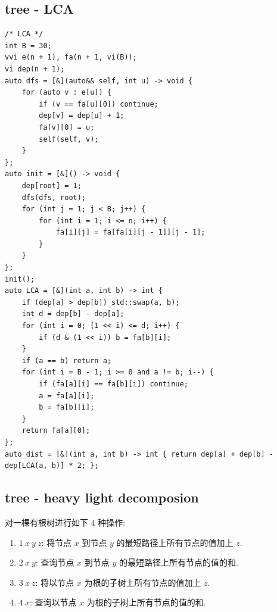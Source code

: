 \documentclass[UTF8, a4paper, titlepage, twoside]{ctexart}
\begin{document}
\subsection{ tree - LCA }
\begin{lstlisting}[style=cpp]
/* LCA */
int B = 30;
vvi e(n + 1), fa(n + 1, vi(B));
vi dep(n + 1);
auto dfs = [&](auto&& self, int u) -> void {
    for (auto v : e[u]) {
        if (v == fa[u][0]) continue;
        dep[v] = dep[u] + 1;
        fa[v][0] = u;
        self(self, v);
    }
};
auto init = [&]() -> void {
    dep[root] = 1;
    dfs(dfs, root);
    for (int j = 1; j < B; j++) {
        for (int i = 1; i <= n; i++) {
            fa[i][j] = fa[fa[i][j - 1]][j - 1];
        }
    }
};
init();
auto LCA = [&](int a, int b) -> int {
    if (dep[a] > dep[b]) std::swap(a, b);
    int d = dep[b] - dep[a];
    for (int i = 0; (1 << i) <= d; i++) {
        if (d & (1 << i)) b = fa[b][i];
    }
    if (a == b) return a;
    for (int i = B - 1; i >= 0 and a != b; i--) {
        if (fa[a][i] == fa[b][i]) continue;
        a = fa[a][i];
        b = fa[b][i];
    }
    return fa[a][0];
};
auto dist = [&](int a, int b) -> int { return dep[a] + dep[b] - dep[LCA(a, b)] * 2; };
\end{lstlisting}

\subsection{ tree - heavy light decomposion }
对一棵有根树进行如下 \(4\) 种操作:
\begin{enumerate}
    \item \(1 \ x \ y \ z\): 将节点 \(x\) 到节点 \(y\) 的最短路径上所有节点的值加上 \(z\).
    \item \(2 \ x \ y\): 查询节点 \(x\) 到节点 \(y\) 的最短路径上所有节点的值的和.
    \item \(3 \ x \ z\): 将以节点 \(x\) 为根的子树上所有节点的值加上 \(z\).
    \item \(4 \ x\): 查询以节点 \(x\) 为根的子树上所有节点的值的和.
\end{enumerate}
\end{document}
